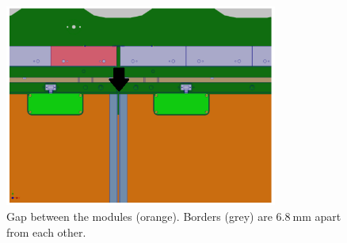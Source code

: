 \begin{figure}[htbp]
    \centering
    \includegraphics[width=0.8\textwidth]{plots/module_gap.png}
    \caption{Gap between the modules (orange). Borders (grey) are $\SI{6.8}{\milli\metre}$ apart from each other.}
    \label{fig:module_gap}
\end{figure}

